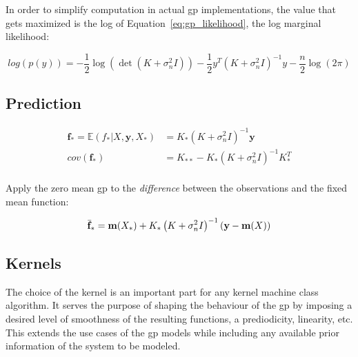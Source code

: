 In order to simplify computation in actual \acrshort{gp} implementations, the
value that gets maximized is the log of Equation~\ref{eq:gp_likelihood}, the log
marginal likelihood:

\begin{equation}\label{eq:gp_log_likelihood}
    log(p(y)) = - \frac{1}{2}\log{\left(
                                \det{\left(
                                        K + \sigma_n^2I
                                \right)}
                            \right)}
                - \frac{1}{2}y^T\left(
                                    K + \sigma_n^2I
                                \right)^{-1}y
                - \frac{n}{2}\log{\left(2\pi\right)}
\end{equation}

\subsection{Prediction}

\begin{equation}
    \begin{aligned}
        \mathbf{f_*} = \mathbb{E}\left(f_*|X, \mathbf{y}, X_*\right) &=
        K_*\left(K + \sigma_n^2I\right)^{-1}\mathbf{y} \\
        cov(\mathbf{f_*}) &= K_{**} - K_*\left(K +\sigma_n^2I\right)^{-1}K_*^T \\
    \end{aligned}
\end{equation}


Apply the zero mean \acrshort{gp} to the \textit{difference} between the
observations and the fixed mean function:

\begin{equation}
    \bar{\mathbf{f}}_* = \mathbf{m}(X_*) + K_*\left(K + 
    \sigma_n^2I\right)^{-1}(\mathbf{y} - \mathbf{m}(X)) \\
\end{equation}

\subsection{Kernels}\label{sec:Kernels}
The choice of the kernel is an important part for any kernel machine class
algorithm. It serves the purpose of shaping the behaviour of the \acrshort{gp}
by imposing a desired level of smoothness of the resulting functions, a
prediodicity, linearity, etc. This extends the use cases of the \acrshort{gp}
models while including any available prior information of the system to be
modeled.

